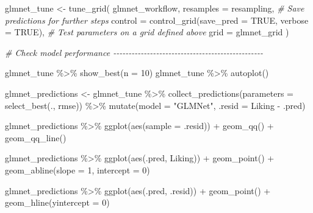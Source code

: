 \documentclass[
]{book}
\newenvironment{Shaded}{\begin{snugshade}}{\end{snugshade}}
\newcommand{\AttributeTok}[1]{\textcolor[rgb]{0.77,0.63,0.00}{#1}}
\newcommand{\CommentTok}[1]{\textcolor[rgb]{0.56,0.35,0.01}{\textit{#1}}}
\newcommand{\ConstantTok}[1]{\textcolor[rgb]{0.00,0.00,0.00}{#1}}
\newcommand{\DecValTok}[1]{\textcolor[rgb]{0.00,0.00,0.81}{#1}}
\newcommand{\FunctionTok}[1]{\textcolor[rgb]{0.00,0.00,0.00}{#1}}
\newcommand{\NormalTok}[1]{#1}
\newcommand{\OtherTok}[1]{\textcolor[rgb]{0.56,0.35,0.01}{#1}}
\newcommand{\SpecialCharTok}[1]{\textcolor[rgb]{0.00,0.00,0.00}{#1}}
\newcommand{\StringTok}[1]{\textcolor[rgb]{0.31,0.60,0.02}{#1}}
\begin{document}
\begin{Shaded}
\begin{Highlighting}[]
\NormalTok{glmnet\_tune }\OtherTok{\textless{}{-}} 
  \FunctionTok{tune\_grid}\NormalTok{(}
\NormalTok{    glmnet\_workflow, }
    \AttributeTok{resamples =}\NormalTok{ resampling, }
    \CommentTok{\# Save predictions for further steps}
    \AttributeTok{control =} \FunctionTok{control\_grid}\NormalTok{(}\AttributeTok{save\_pred =} \ConstantTok{TRUE}\NormalTok{, }\AttributeTok{verbose =} \ConstantTok{TRUE}\NormalTok{),}
    \CommentTok{\# Test parameters on a grid defined above}
    \AttributeTok{grid =}\NormalTok{ glmnet\_grid}
\NormalTok{    ) }

\CommentTok{\# Check model performance {-}{-}{-}{-}{-}{-}{-}{-}{-}{-}{-}{-}{-}{-}{-}{-}{-}{-}{-}{-}{-}{-}{-}{-}{-}{-}{-}{-}{-}{-}{-}{-}{-}{-}{-}{-}{-}{-}{-}{-}{-}{-}{-}{-}{-}{-}{-}{-}{-}}

\NormalTok{glmnet\_tune }\SpecialCharTok{\%\textgreater{}\%} \FunctionTok{show\_best}\NormalTok{(}\AttributeTok{n =} \DecValTok{10}\NormalTok{)}
\NormalTok{glmnet\_tune }\SpecialCharTok{\%\textgreater{}\%} \FunctionTok{autoplot}\NormalTok{()}

\NormalTok{glmnet\_predictions }\OtherTok{\textless{}{-}}\NormalTok{ glmnet\_tune }\SpecialCharTok{\%\textgreater{}\%}
  \FunctionTok{collect\_predictions}\NormalTok{(}\AttributeTok{parameters =} \FunctionTok{select\_best}\NormalTok{(., }\StringTok{\textquotesingle{}rmse\textquotesingle{}}\NormalTok{)) }\SpecialCharTok{\%\textgreater{}\%}
  \FunctionTok{mutate}\NormalTok{(}\AttributeTok{model =} \StringTok{"GLMNet"}\NormalTok{,}
         \AttributeTok{.resid =}\NormalTok{ Liking }\SpecialCharTok{{-}}\NormalTok{ .pred)}

\NormalTok{glmnet\_predictions }\SpecialCharTok{\%\textgreater{}\%}
  \FunctionTok{ggplot}\NormalTok{(}\FunctionTok{aes}\NormalTok{(}\AttributeTok{sample =}\NormalTok{ .resid)) }\SpecialCharTok{+}
  \FunctionTok{geom\_qq}\NormalTok{() }\SpecialCharTok{+}
  \FunctionTok{geom\_qq\_line}\NormalTok{()}

\NormalTok{glmnet\_predictions }\SpecialCharTok{\%\textgreater{}\%}
  \FunctionTok{ggplot}\NormalTok{(}\FunctionTok{aes}\NormalTok{(.pred, Liking)) }\SpecialCharTok{+}
  \FunctionTok{geom\_point}\NormalTok{() }\SpecialCharTok{+}
  \FunctionTok{geom\_abline}\NormalTok{(}\AttributeTok{slope =} \DecValTok{1}\NormalTok{, }\AttributeTok{intercept =} \DecValTok{0}\NormalTok{)}

\NormalTok{glmnet\_predictions }\SpecialCharTok{\%\textgreater{}\%}
  \FunctionTok{ggplot}\NormalTok{(}\FunctionTok{aes}\NormalTok{(.pred, .resid)) }\SpecialCharTok{+}
  \FunctionTok{geom\_point}\NormalTok{() }\SpecialCharTok{+}
  \FunctionTok{geom\_hline}\NormalTok{(}\AttributeTok{yintercept =} \DecValTok{0}\NormalTok{)}


\end{Highlighting}
\end{Shaded}
\end{document}
